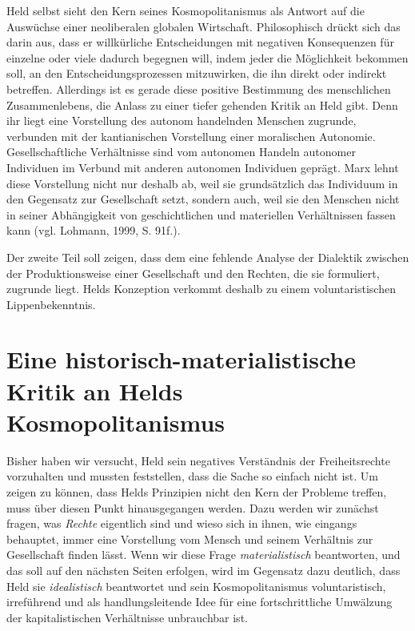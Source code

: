 \documentclass[ngerman,12pt, titlepage, smallheadings, nomath]{scrartcl}
\begin{document}
Held selbst sieht den Kern seines Kosmopolitanismus als Antwort auf die
Auswüchse einer neoliberalen globalen Wirtschaft. Philosophisch drückt
sich das darin aus, dass er willkürliche Entscheidungen mit negativen
Konsequenzen für einzelne oder viele dadurch begegnen will, indem jeder
die Möglichkeit bekommen soll, an den Entscheidungsprozessen
mitzuwirken, die ihn direkt oder indirekt betreffen. Allerdings ist es
gerade diese positive Bestimmung des menschlichen Zusammenlebens, die
Anlass zu einer tiefer gehenden Kritik an Held gibt. Denn ihr liegt eine
Vorstellung des autonom handelnden Menschen zugrunde, verbunden mit der
kantianischen Vorstellung einer moralischen Autonomie. Gesellschaftliche
Verhältnisse sind vom autonomen Handeln autonomer Individuen im Verbund
mit anderen autonomen Individuen geprägt. Marx lehnt diese Vorstellung
nicht nur deshalb ab, weil sie grundsätzlich das Individuum in den
Gegensatz zur Gesellschaft setzt, sondern auch, weil sie den Menschen
nicht in seiner Abhängigkeit von geschichtlichen und materiellen
Verhältnissen fassen kann (vgl. Lohmann, 1999, S. 91f.).

Der zweite Teil soll zeigen, dass dem eine fehlende Analyse der
Dialektik zwischen der Produktionsweise einer Gesellschaft und den
Rechten, die sie formuliert, zugrunde liegt. Helds Konzeption verkommt
deshalb zu einem voluntaristischen Lippenbekenntnis.

\section{Eine historisch-materialistische Kritik an Helds
Kosmopolitanismus}\label{eine-historisch-materialistische-kritik-an-helds-kosmopolitanismus}

Bisher haben wir versucht, Held sein negatives Verständnis der
Freiheitsrechte vorzuhalten und mussten feststellen, dass die Sache so
einfach nicht ist. Um zeigen zu können, dass Helds Prinzipien nicht den
Kern der Probleme treffen, muss über diesen Punkt hinausgegangen werden.
Dazu werden wir zunächst fragen, was \emph{Rechte} eigentlich sind und
wieso sich in ihnen, wie eingangs behauptet, immer eine Vorstellung vom
Mensch und seinem Verhältnis zur Gesellschaft finden lässt. Wenn wir
diese Frage \emph{materialistisch} beantworten, und das soll auf den
nächsten Seiten erfolgen, wird im Gegensatz dazu deutlich, dass Held sie
\emph{idealistisch} beantwortet und sein Kosmopolitanismus
voluntaristisch, irreführend und als handlungsleitende Idee für eine
fortschrittliche Umwälzung der kapitalistischen Verhältnisse unbrauchbar
ist.
\end{document}
